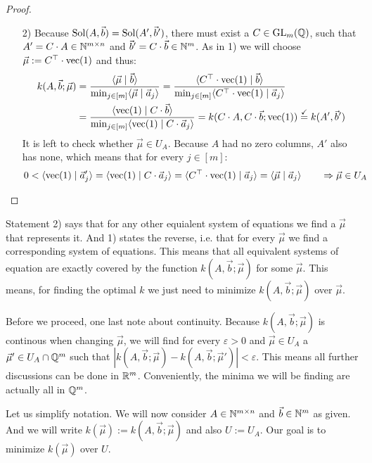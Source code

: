 \begin{proof}
\begin{enumerate}
        \item[2)] Because $\operatorname{Sol}(A, \vec b) = \operatorname{Sol}(A', \vec b')$, there must exist a $C \in \operatorname{GL}_m(\mathbb{Q})$, such that $A' = C \cdot A \in \mathbb{N}^{m \times n}$ and $\vec b' = C \cdot \vec b \in \mathbb{N}^m$. As in 1) we will choose $\vec \mu := C^\top \cdot \operatorname{vec}(1)$ and thus:
        \begin{align*}
            k(A, \vec b; \vec\mu) &= \frac{\langle \vec\mu \mid \vec b \rangle}{\min_{j\in [m]}\langle \vec\mu \mid \vec a_j \rangle} = \frac{\langle C^\top\cdot\operatorname{vec}(1) \mid \vec b \rangle}{\min_{j\in [m]}\langle C^\top\cdot\operatorname{vec}(1) \mid \vec a_j \rangle}\\
            &= \frac{\langle \operatorname{vec}(1) \mid C\cdot\vec b \rangle}{\min_{j\in [m]}\langle \operatorname{vec}(1) \mid C\cdot\vec a_j \rangle} = k(C\cdot A, C\cdot\vec b; \operatorname{vec}(1)) \stackrel{\checkmark}{=} k(A', \vec b')
        \end{align*}
        It is left to check whether $\vec \mu \in U_A$. Because $A$ had no zero columns, $A'$ also has none, which means that for every $j \in [m]$:
        \begin{equation*}
            0 < \langle \operatorname{vec}(1) \mid \vec a'_j \rangle = \langle \operatorname{vec}(1) \mid C \cdot \vec a_j \rangle = \langle C^\top \cdot \operatorname{vec}(1) \mid \vec a_j \rangle = \langle \vec \mu \mid \vec a_j \rangle \qquad \Rightarrow\vec \mu \in U_A \qedhere
        \end{equation*}

    \end{enumerate}
\end{proof}

Statement 2) says that for any other equialent system of equations we find a $\vec \mu$ that represents it. And 1) states the reverse, i.e. that for every $\vec \mu$ we find a corresponding system of equations. This means that all equivalent systems of equation are exactly covered by the function $k(A, \vec b; \vec\mu)$ for some $\vec \mu$. This means, for finding the optimal $k$ we just need to minimize $k(A, \vec b; \vec \mu)$ over $\vec \mu$.

Before we proceed, one last note about continuity. Because $k(A, \vec b; \vec \mu)$ is continous when changing $\vec\mu$, we will find for every $\varepsilon > 0$ and $\vec\mu \in U_A$ a $\vec\mu' \in U_A \cap \mathbb{Q}^m$ such that $|k(A, \vec b; \vec \mu) - k(A, \vec b; \vec \mu')| < \varepsilon$. This means all further discussions can be done in $\mathbb{R}^m$. Conveniently, the minima we will be finding are actually all in $\mathbb{Q}^m$.

Let us simplify notation. We will now consider $A \in \mathbb{N}^{m \times n}$ and $\vec b \in \mathbb{N}^m$ as given. And we will write $k(\vec \mu) := k(A, \vec b; \vec \mu)$ and also $U := U_A$. Our goal is to minimize $k(\vec \mu)$ over $U$.

